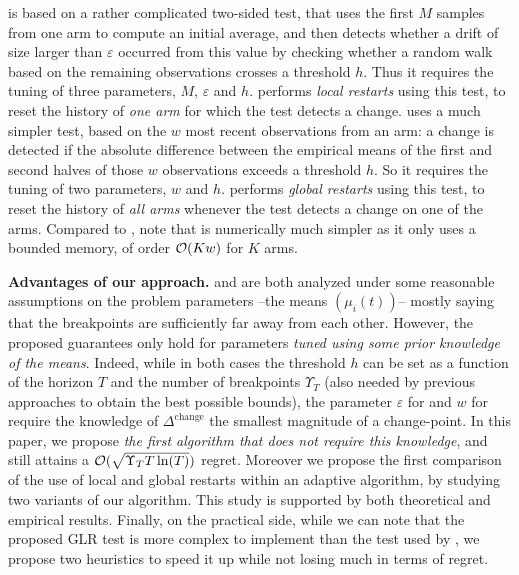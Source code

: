 \CUSUMUCB{} is based on a rather complicated two-sided \CUSUM{} test, that uses the first $M$ samples from one arm to compute an initial average, and then detects whether a drift of size larger than $\varepsilon$ occurred from this value by checking whether a random walk based on the remaining observations crosses a threshold $h$. Thus it requires the tuning of three parameters, $M$, $\varepsilon$ and $h$. \CUSUMUCB{} performs \emph{local restarts} using this test, to reset the history of \emph{one arm} for which the test detects a change.
\MUCB{} uses a much simpler test, based on the $w$ most recent observations from an arm: a change is detected if the absolute difference between the empirical means of the first and second halves of those $w$ observations exceeds a threshold $h$. So it requires the tuning of two parameters, $w$ and $h$. \MUCB{} performs \emph{global restarts} using this test, to reset the history of \emph{all arms} whenever the test detects a change on one of the arms.
Compared to \CUSUMUCB{}, note that \MUCB{} is numerically much simpler as it only uses a bounded memory, of order $\mathop{}\mathopen{}\mathcal{O}\mathopen{}\left(K w\right)$ for $K$ arms.


\textbf{Advantages of our approach.}
\CUSUMUCB{} and \MUCB{} are both analyzed under some reasonable assumptions on the problem parameters --the means $(\mu_i(t))$-- mostly saying that the breakpoints are sufficiently far away from each other.
%
However, the proposed guarantees only hold for parameters \emph{tuned using some prior knowledge of the means}.
Indeed, while in both cases the threshold $h$ can be set as a function of the horizon $T$ and the number of breakpoints  $\Upsilon_T$ (also needed by previous approaches to obtain the best possible bounds), the parameter $\varepsilon$ for \CUSUM{} and $w$ for \MUCB{} require the knowledge of $\Delta^{\text{change}}$ the smallest magnitude of a change-point.
%
In this paper, we propose \emph{the first algorithm that does not require this knowledge}, and still attains a $\mathcal{O}(\sqrt{\Upsilon_T T\ln(T)})$ regret.
Moreover we propose the first comparison of the use of local and global restarts within an adaptive algorithm, by studying two variants of our algorithm.
This study is supported by both theoretical and empirical results.
%
Finally, on the practical side, while we can note that the proposed GLR test is more complex to implement than the test used by \MUCB, we propose two heuristics to speed it up while not losing  much in terms of regret.

